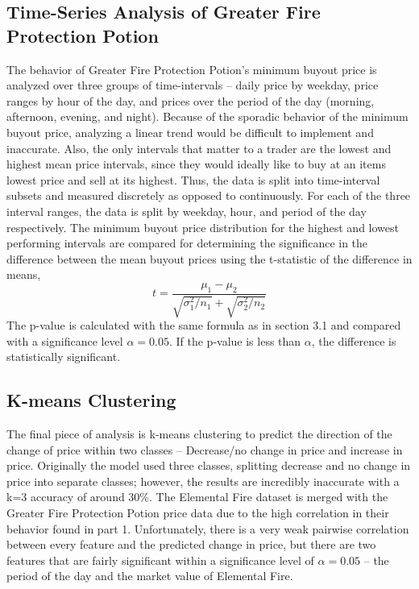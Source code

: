 \documentclass[sigconf]{acmart}
\begin{document}
\subsection{Time-Series Analysis of Greater Fire Protection Potion}
The behavior of Greater Fire Protection Potion’s minimum buyout price is analyzed over three groups of time-intervals – daily price by weekday, price ranges by hour of the day, and prices over the period of the day (morning, afternoon, evening, and night). Because of the sporadic behavior of the minimum buyout price, analyzing a linear trend would be difficult to implement and inaccurate. Also, the only intervals that matter to a trader are the lowest and highest mean price intervals, since they would ideally like to buy at an items lowest price and sell at its highest. Thus, the data is split into time-interval subsets and measured discretely as opposed to continuously. For each of the three interval ranges, the data is split by weekday, hour, and period of the day respectively. The minimum buyout price distribution for the highest and lowest performing intervals are compared for determining the significance in the difference between the mean buyout prices using the t-statistic of the difference in means,
\[ t = \frac{\mu_1 - \mu_2}{\sqrt{\sigma_1^2 / n_1} + \sqrt{\sigma_2^2 / n_2}} \]
The p-value is calculated with the same formula as in section 3.1 and compared with a significance level \( \alpha = 0.05 \). If the p-value is less than \( \alpha \), the difference is statistically significant.


\subsection{K-means Clustering}
The final piece of analysis is k-means clustering to predict the direction of the change of price within two classes – Decrease/no change in price and increase in price. Originally the model used three classes, splitting decrease and no change in price into separate classes; however, the results are incredibly inaccurate with a k=3 accuracy of around 30\%. The Elemental Fire dataset is merged with the Greater Fire Protection Potion price data due to the high correlation in their behavior found in part 1. Unfortunately, there is a very weak pairwise correlation between every feature and the predicted change in price, but there are two features that are fairly significant within a significance level of \( \alpha = 0.05 \) – the period of the day and the market value of Elemental Fire.
\end{document}
